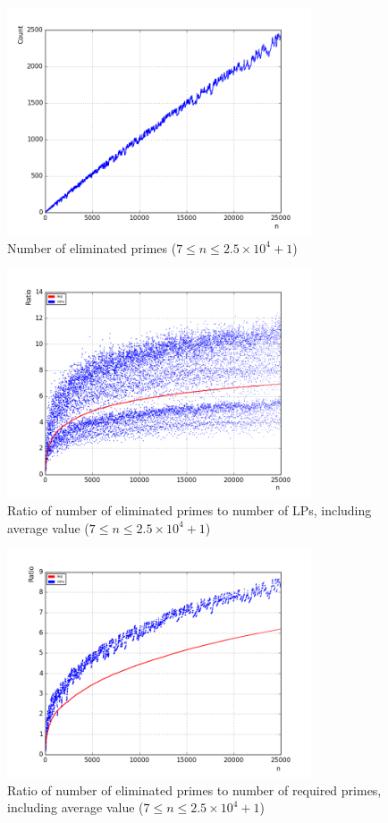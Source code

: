 \documentclass[10pt,twocolumn]{article}
\begin{document}
\begin{figure}[!ht]
\centering
\captionsetup{justification=centering}
\includegraphics[width=9cm]{f_number_of_eliminated_primes}
\caption[caption]{Number of eliminated primes ($7 \leq n \leq 2.5 \times 10^4 + 1$)}
\label{fig:numberofeliminatedprimes}
\end{figure}

\begin{figure}[!ht]
\centering
\captionsetup{justification=centering}
\includegraphics[width=9cm]{f_eliminated_primes_to_partitions}
\caption[caption]{Ratio of number of eliminated primes to number of LPs, including average value ($7 \leq n \leq 2.5 \times 10^4 + 1$)}
\label{fig:numberofeliminatedprimestopartitions}
\end{figure}

\begin{figure}[!ht]
\centering
\captionsetup{justification=centering}
\includegraphics[width=9cm]{f_eliminated_primes_to_req_primes}
\caption[caption]{Ratio of number of eliminated primes to number of required primes, including average value ($7 \leq n \leq 2.5 \times 10^4 + 1$)}
\label{fig:numberofeliminatedprimestorequiredprimes}
\end{figure}
\end{document}
